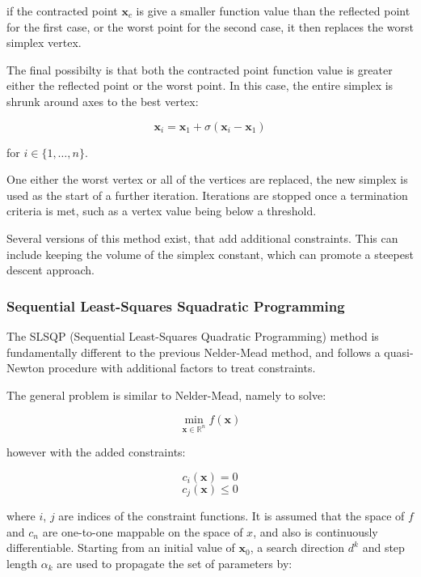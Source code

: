 if the contracted point $\mathbf{x}_c$ is give a smaller function value than the 
reflected point for the first case, or the worst point for the second case, it then
replaces the worst simplex vertex.

The final possibilty is that both the contracted point function value is greater 
either the reflected point or the worst point. In this case, the entire simplex
is shrunk around axes to the best vertex:

\begin{equation}
\mathbf{x}_i = \mathbf{x}_1 + \sigma \left(\mathbf{x}_i - \mathbf{x}_1 \right)
\end{equation}

for $i \in \{1, \dots, n\}$.

One either the worst vertex or all of the vertices are replaced, the new simplex
is used as the start of a further iteration. Iterations are stopped once a termination
criteria is met, such as a vertex value being below a threshold.

Several versions of this method exist, that add additional constraints. This can
include keeping the volume of the simplex constant, which can promote a steepest
descent approach.

\subsubsection{Sequential Least-Squares Squadratic Programming}
\label{subsubsec:slsqp}
The SLSQP (Sequential Least-Squares Quadratic Programming) method is fundamentally
different to the previous Nelder-Mead method, and follows a quasi-Newton procedure
with additional factors to treat constraints.

The general problem is similar to Nelder-Mead, namely to solve:

\begin{equation}
\min_{\mathbf{x} \in \mathbb{R}^n} f\left( \mathbf{x}\right)
\end{equation}

however with the added constraints:

\begin{equation}
c_i \left(\mathbf{x} \right) = 0
\end{equation}
\begin{equation}
c_j \left(\mathbf{x} \right) \leq 0
\end{equation}

where $i$, $j$ are indices of the constraint functions.
It is assumed that the space of $f$ and $c_n$ are one-to-one mappable on the
space of $x$, and also is continuously differentiable. Starting from an initial
value of $\mathbf{x}_0$, a search direction $d^k$ and step length $\alpha_k$ are
used to propagate the set of parameters by:

